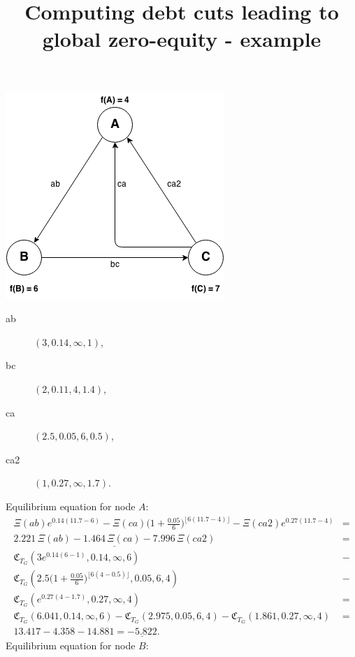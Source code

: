\documentclass[10pt]{article}
\title{Computing debt cuts leading to global zero-equity - example}
\newcommand{\CC}{\mathfrak{C}}
\begin{document}
  \maketitle

\begin{center}
\centerline{\includegraphics{lce-sample}}
\end{center}
\begin{description}
\item[ab] $(3,0.14,\infty,1)$,
\item[bc] $(2, 0.11, 4, 1.4)$,
\item[ca] $(2.5, 0.05, 6, 0.5)$,
\item[ca2] $(1, 0.27, \infty, 1.7)$.
\end{description}
Equilibrium equation for node $A$:
\begin{align*}
\Xi(ab)e^{0.14 (11.7 - 6)} - \Xi(ca) \Big( 1 + \frac{0.05}{6} \Big)^{ \lfloor 6 (11.7 - 4) \rfloor } - \Xi(ca2) e^{0.27 (11.7 - 4)} &= \\
\underline{2.221 \, \Xi(ab) - 1.464 \, \Xi(ca) - 7.996 \, \Xi(ca2)} &= \\
\CC_{T_G} ( 3e^{ 0.14(6 - 1) }, 0.14, \infty, 6 ) &- \\
\CC_{T_G} ( 2.5 \Big( 1 + \frac{0.05}{6} \Big)^{ \lfloor 6(4 - 0.5) \rfloor }, 0.05, 6, 4 ) &- \\
 \CC_{T_G} ( e^{ 0.27 (4 - 1.7) }, 0.27, \infty, 4 ) &= \\
 \CC_{T_G} (6.041, 0.14, \infty, 6) - \CC_{T_G} ( 2.975, 0.05, 6, 4 ) - \CC_{T_G} ( 1.861, 0.27, \infty, 4 ) &= \\
 13.417 - 4.358 - 14.881 = \underline{-5.822}.
\end{align*}
Equilibrium equation for node $B$:
\end{document}
